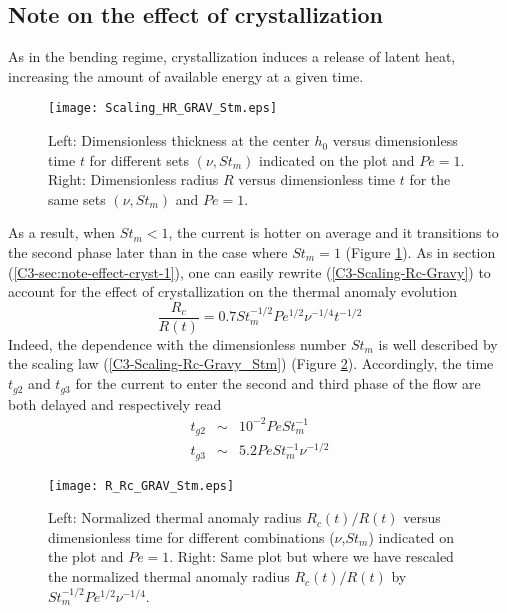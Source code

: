 \subsection{Note on the effect of crystallization}
\label{C3-sec:note-effect-cryst-2}

As in the bending regime,  crystallization induces a release of latent
heat, increasing the amount of available energy at a given time.
\begin{figure}
  \begin{center}
    \graphicspath{ {/Users/thorey/Documents/These/Projet/Refroidissement/Skin_Model/Figure/JFM_V13/} }
    \texttt{[image: Scaling\_HR\_GRAV\_Stm.eps]}
    \caption{Left: Dimensionless thickness at  the center $h_0$ versus
      dimensionless time $t$ for different sets $(\nu,St_m)$ indicated
      on the plot  and $Pe=1$. Right: Dimensionless  radius $R$ versus
      dimensionless  time  $t$  for  the same  sets  $(\nu,St_m)$  and
      $Pe=1$.}
    \label{C3-Scaling_HR_GRAV_Stm}
  \end{center}
\end{figure}
As a  result, when $St_m<1$, the  current is hotter on  average and it
transitions to the second phase later  than in the case where $St_m=1$
(Figure     \ref{C3-Scaling_HR_GRAV_Stm}).       As     in     section
(\ref{C3-sec:note-effect-cryst-1}),    one    can    easily    rewrite
(\ref{C3-Scaling-Rc-Gravy})   to    account   for   the    effect   of
crystallization on the thermal anomaly evolution
\begin{equation}
  \frac{R_c}{R(t)} = 0.7 St_m^{-1/2}Pe^{1/2}\nu^{-1/4}t^{-1/2}
  \label{C3-Scaling-Rc-Gravy_Stm}
\end{equation}
Indeed, the  dependence with the  dimensionless number $St_m$  is well
described by  the scaling law  (\ref{C3-Scaling-Rc-Gravy_Stm}) (Figure
\ref{C3-R_Rc_GRAV_Stm}).  Accordingly, the  time $t_{g2}$ and $t_{g3}$
for the current  to enter the second  and third phase of  the flow are
both delayed and respectively read
\begin{eqnarray}
  t_{g2}&\sim&10^{-2}PeSt_m^{-1}\label{C3-tg2}\\
  t_{g3}&\sim& 5.2Pe St_m^{-1}\nu^{-1/2}\label{C3-tg3}
\end{eqnarray}

\begin{figure}
  \begin{center}
    \graphicspath{ {/Users/thorey/Documents/These/Projet/Refroidissement/Skin_Model/Figure/JFM_V13/} }
    \texttt{[image: R\_Rc\_GRAV\_Stm.eps]}
    \caption{Left:  Normalized  thermal anomaly  radius  $R_c(t)/R(t)$
      versus   dimensionless    time   for    different   combinations
      ($\nu$,$St_m$) indicated  on the  plot and $Pe=1$.   Right: Same
      plot but where  we have rescaled the  normalized thermal anomaly
      radius $R_c(t)/R(t)$ by $St_m^{-1/2}Pe^{1/2}\nu^{-1/4}$.}
    \label{C3-R_Rc_GRAV_Stm}
  \end{center}
\end{figure}

